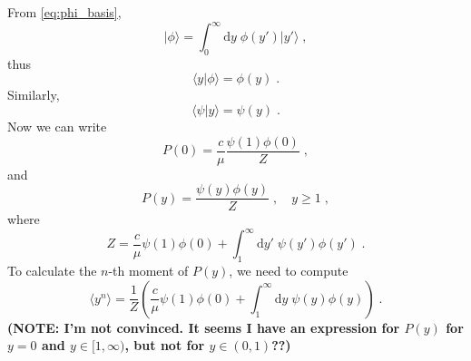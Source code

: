 \documentclass[a4paper,10pt]{article}
\newcommand{\D}{\mathrm{d}}
\newcommand{\ket}[1]{\vert #1 \rangle}
\newcommand{\braket}[2]{\langle #1 \vert #2 \rangle}
\newcommand{\Ai}{\mathrm{Ai}}
\begin{document}
From \eqref{eq:phi_basis}, 
\begin{equation}
  \ket{\phi} = \int_{0}^\infty  \D y\; \phi(y') \ket{y'}\;,
\end{equation}
thus
\begin{equation}
  \braket{y}{\phi} = \phi(y) \;.
\end{equation}
Similarly,
\begin{equation}
  \braket{\psi}{y} = \psi(y)\;.
\end{equation}
Now we can write
\begin{equation}
  P(0) = \frac{c}{\mu} \frac{\psi(1)\phi(0)}{Z} \;,
\end{equation}
and
\begin{equation}
 P(y) = \frac{ \psi(y)\phi(y)}{Z} \;, \quad y \ge 1 \;,
\end{equation}
where
\begin{equation}
  Z = \frac{c}{\mu}\psi(1)\phi(0)  + \int_{1}^\infty \D y' \; \psi(y')\phi(y') \;.
\end{equation}
To calculate the $n$-th moment of $P(y)$, we need to compute
\begin{equation}
  \langle y^n \rangle = \frac{1}{Z} \left( \frac{c}{\mu}\psi(1)\phi(0)  + \int_{1}^\infty \D y \; \psi(y)\phi(y) \right) \;.
\end{equation}
{\bf (NOTE: I'm not convinced. It seems I have an expression for $P(y)$ for $y=0$ and $y\in[1,\infty)$, but not for $y\in(0,1)$??)}

\end{document}
